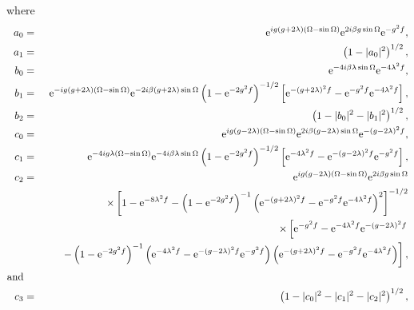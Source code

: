 where 
\begin{eqnarray}\label{coef_orthonormal_evolved_state_qcv}
a_{0}&=&\textrm{e}^{ig\left(g+2\lambda\right)\left(\Omega-\sin\Omega\right)}\textrm{e}^{2i\beta g \sin\Omega}\textrm{e}^{-g^{2}f},\nonumber\\
a_{1}&=&\left(1-|a_{0}|^{2}\right)^{1/2},\nonumber\\
b_{0}&=&\textrm{e}^{-4i\beta \lambda \sin\Omega}\textrm{e}^{-4\lambda^2 f},\nonumber\\
b_{1}&=&\textrm{e}^{-ig\left(g+2\lambda\right)\left(\Omega-\sin\Omega\right)}\textrm{e}^{-2i\beta \left(g+2\lambda\right) \sin\Omega}\left(1-\textrm{e}^{-2g^2 f}\right)^{-1/2}\left[\textrm{e}^{-\left(g+2\lambda\right)^{2} f}-\textrm{e}^{-g^{2}f}\textrm{e}^{-4\lambda^{2}f}\right],\nonumber\\
b_{2}&=&\left(1-|b_{0}|^{2}-|b_{1}|^{2}\right)^{1/2},\nonumber\\
c_{0}&=&\textrm{e}^{ig\left(g-2\lambda\right)\left(\Omega-\sin\Omega\right)}\textrm{e}^{2i\beta \left(g-2\lambda\right) \sin\Omega}\textrm{e}^{-\left(g-2\lambda\right)^{2} f},\nonumber\\
c_{1}&=&\textrm{e}^{-4ig\lambda\left(\Omega-\sin\Omega\right)}\textrm{e}^{-4i\beta \lambda \sin\Omega}\left(1-\textrm{e}^{-2g^2 f}\right)^{-1/2}\left[\textrm{e}^{-4\lambda^2 f}-\textrm{e}^{-\left(g-2\lambda \right)^{2} f}\textrm{e}^{-g^{2}f}\right],\nonumber\\
c_{2}&=&\textrm{e}^{ig\left(g-2\lambda\right)\left(\Omega-\sin\Omega\right)}\textrm{e}^{2i\beta g \sin\Omega}\nonumber\\
     &&\hspace{2.1cm}\times\left[1-\textrm{e}^{-8\lambda^{2}f}-\left(1-\textrm{e}^{-2g^2 f}\right)^{-1}\left(\textrm{e}^{-\left(g+2\lambda\right)^{2} f}-\textrm{e}^{-g^2 f}\textrm{e}^{-4\lambda^{2}f}\right)^{2}\right]^{-1/2}\nonumber\\
     &&\times\left[\textrm{e}^{-g^2 f}-\textrm{e}^{-4\lambda^{2}f}\textrm{e}^{-\left(g-2\lambda\right)^{2} f}\right.\nonumber\\
     &&\left.-\left(1-\textrm{e}^{-2g^2 f}\right)^{-1}\left(\textrm{e}^{-4\lambda^{2}f}-\textrm{e}^{-\left(g-2\lambda\right)^{2} f}\textrm{e}^{-g^2 f}\right)\left(\textrm{e}^{-\left(g+2\lambda\right)^{2} f}-\textrm{e}^{-g^2 f}\textrm{e}^{-4\lambda^{2}f}\right)\right],\nonumber\\
\text{and}&&\nonumber\\
c_{3}&=&\left(1-|c_{0}|^{2}-|c_{1}|^{2}-|c_{2}|^{2}\right)^{1/2},
\end{eqnarray}
